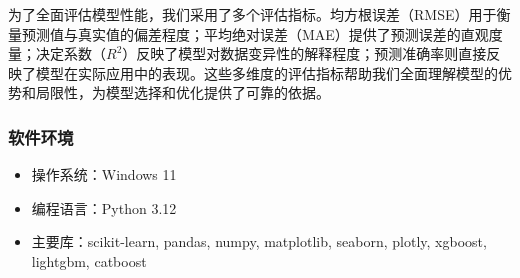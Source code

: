 为了全面评估模型性能，我们采用了多个评估指标。均方根误差（RMSE）用于衡量预测值与真实值的偏差程度；平均绝对误差（MAE）提供了预测误差的直观度量；决定系数（$R^2$）反映了模型对数据变异性的解释程度；预测准确率则直接反映了模型在实际应用中的表现。这些多维度的评估指标帮助我们全面理解模型的优势和局限性，为模型选择和优化提供了可靠的依据。

\subsubsection{软件环境}
\begin{itemize}
    \item 操作系统：Windows 11
    \item 编程语言：Python 3.12
    \item 主要库：scikit-learn, pandas, numpy, matplotlib, seaborn, plotly, xgboost, lightgbm, catboost
\end{itemize} 